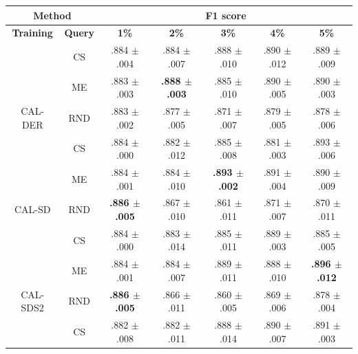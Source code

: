 \begin{table}[htbp]
\centering

\begin{tabular*}{\linewidth}{c|c|@{\extracolsep{\fill}}ccccc}
\toprule
\multicolumn{2}{c|}{\textbf{Method}} & \multicolumn{5}{c}{\textbf{F1 score}} \\
\midrule
\textbf{Training} & \textbf{Query} & \textbf{1\%} & \textbf{2\%} & \textbf{3\%} & \textbf{4\%} & \textbf{5\%}\\
\midrule
 & CS & .884 $\pm$ {\small .004} & .884 $\pm$ {\small .007} & .888 $\pm$ {\small .010} & .890 $\pm$ {\small .012} & .889 $\pm$ {\small .009}\\

 & ME & .883 $\pm$ {\small .003} & \textbf{.888 $\pm$ {\small .003}} & .885 $\pm$ {\small .010} & .890 $\pm$ {\small .005} & .890 $\pm$ {\small .003}\\

\multirow{-3}{*}{\raggedright\arraybackslash CAL-DER} & RND & .883 $\pm$ {\small .002} & .877 $\pm$ {\small .005} & .871 $\pm$ {\small .007} & .879 $\pm$ {\small .005} & .878 $\pm$ {\small .006}\\
\midrule
 & CS & .884 $\pm$ {\small .000} & .882 $\pm$ {\small .012} & .885 $\pm$ {\small .008} & .881 $\pm$ {\small .003} & .893 $\pm$ {\small .006}\\

 & ME & .884 $\pm$ {\small .001} & .884 $\pm$ {\small .010} & \textbf{.893 $\pm$ {\small .002}} & .891 $\pm$ {\small .004} & .890 $\pm$ {\small .009}\\

\multirow{-3}{*}{\raggedright\arraybackslash CAL-SD} & RND & \textbf{.886 $\pm$ {\small .005}} & .867 $\pm$ {\small .010} & .861 $\pm$ {\small .011} & .871 $\pm$ {\small .007} & .870 $\pm$ {\small .011}\\
\midrule
 & CS & .884 $\pm$ {\small .000} & .883 $\pm$ {\small .014} & .885 $\pm$ {\small .011} & .889 $\pm$ {\small .003} & .885 $\pm$ {\small .005}\\

 & ME & .884 $\pm$ {\small .001} & .884 $\pm$ {\small .007} & .889 $\pm$ {\small .011} & .888 $\pm$ {\small .010} & \textbf{.896 $\pm$ {\small .012}}\\

\multirow{-3}{*}{\raggedright\arraybackslash CAL-SDS2} & RND & \textbf{.886 $\pm$ {\small .005}} & .866 $\pm$ {\small .011} & .860 $\pm$ {\small .005} & .869 $\pm$ {\small .006} & .878 $\pm$ {\small .004}\\
\midrule
 & CS & .882 $\pm$ {\small .008} & .882 $\pm$ {\small .011} & .888 $\pm$ {\small .014} & .890 $\pm$ {\small .007} & .891 $\pm$ {\small .003}\\


\end{tabular*}
\end{table}
